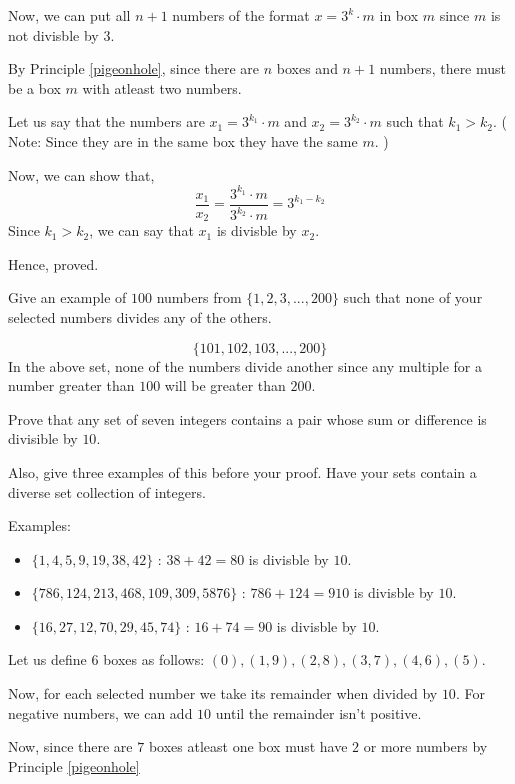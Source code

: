 Now, we can put all $n+1$ numbers of the format $x = 3^k \cdot m$ in box $m$ since $m$ is not divisble by $3$.

By Principle \ref{pigeonhole}, since there are $n$ boxes and $n+1$ numbers, there must be a box $m$ with atleast two numbers.

Let us say that the numbers are $x_1 = 3^{k_1} \cdot m$ and $x_2 = 3^{k_2} \cdot m$ such that $k_1 > k_2$. ( Note: Since they are in the same box they have the same $m$. )

Now, we can show that,
$$\frac{x_1}{x_2} = \frac{3^{k_1} \cdot m}{3^{k_2} \cdot m} = 3^{k_1 - k_2}$$
Since $k_1 > k_2$, we can say that $x_1$ is divisble by $x_2$.

Hence, proved.

\es

\bp 
	Give an example of $100$ numbers from $\{1, 2, 3, ..., 200\}$ such that none of your selected numbers divides any of the others.
\ep 

\bs
	$$\{101,102,103,...,200\}$$
	In the above set, none of the numbers divide another since any multiple for a number greater than $100$ will be greater than $200$.
\es

\bp 
	Prove that any set of seven integers contains a pair whose sum or difference is divisible by $10$. 

	Also, give three examples of this before your proof. Have your sets contain a diverse set collection of integers.
\ep 

\begin{scratch}
	Examples:
	\begin{itemize}
		\item $\{ 1, 4, 5, 9, 19, 38, 42 \}$ : $38+42=80$ is divisble by $10$.
		\item $\{ 786, 124, 213, 468, 109, 309, 5876 \}$ : $786+124=910$ is divisble by $10$.
		\item $\{ 16, 27, 12, 70, 29, 45, 74 \}$ : $16+74=90$ is divisble by $10$.
	\end{itemize}
\end{scratch}

\bs
	Let us define $6$ boxes as follows: $(0), (1,9), (2,8), (3,7), (4,6), (5)$.

	Now, for each selected number we take its remainder when divided by $10$.
	For negative numbers, we can add $10$ until the remainder isn't positive.

	Now, since there are $7$ boxes atleast one box must have $2$ or more numbers by Principle \ref{pigeonhole}

